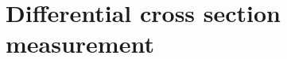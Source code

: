 \chapter[Differential cross section measurement]{Differential cross section \\
measurement}
\ifpdf
    \graphicspath{{06_Cross_section_analysis/plots/}}
\else
    \graphicspath{{06_Cross_section_analysis/plots/EPS/}{06_Cross_section_analysis/plots/}}
\fi




